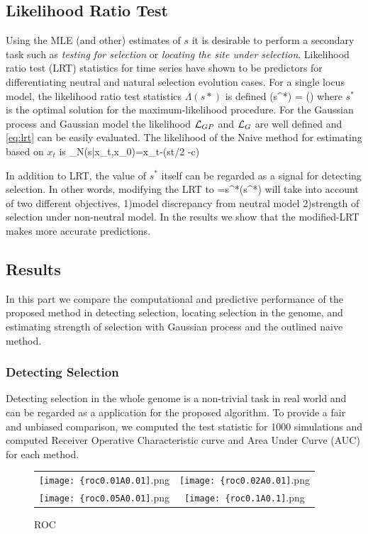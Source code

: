\subsection{Likelihood Ratio Test}
Using the MLE (and other) estimates of $s$ it is desirable to perform a secondary task such as \emph{testing for selection} or \emph{locating the site under selection}. Likelihood ratio test (LRT) statistics for time series \cite{feder2014} have shown to be predictors for differentiating neutral and natural selection evolution cases. For a single locus model, the likelihood ratio test statistics $\Lambda(s*)$ is defined
\beq \label{eq:lrt}
\Lambda(s^*) = \log \left(\right)
\eeq
where $s^*$ is the optimal solution for the maximum-likelihood procedure. For the Gaussian process and Gaussian model the likelihood ${\cal L}_{GP}$ and ${\cal L}_G$ are well defined and \eqref{eq:lrt} can be easily evaluated. The likelihood of the Naive method for estimating based on $x_t$ is 
\beq
\Lc_N(s|x_t,x_0)=x_t-\sigma(st/2 -c)
\eeq

In addition to LRT, the value of $s^*$ itself can be regarded as a signal for detecting selection. In other words, modifying the LRT to
\beq
\Theta=s^*\Lambda(s^*)
\eeq
will take into account of two different objectives, 1)model discrepancy from neutral model 2)strength of selection under non-neutral model. In the  results we show that the modified-LRT makes more accurate predictions.

\subsection{Results}
In this part we compare the computational and predictive performance of the proposed method in detecting selection, locating selection in the genome, and estimating strength of selection with Gaussian process and the outlined naive method.

\subsubsection{Detecting Selection}
Detecting selection in the whole genome is a non-trivial task in real world and can be regarded as a application for the proposed algorithm. To provide a fair and unbiased comparison, we computed the test statistic for 1000 simulations and computed Receiver Operative Characteristic curve and Area Under Curve (AUC) for each method.



\begin{figure}[H]
  \centering
  \begin{tabular}{cc}
      \texttt{[image: \{roc0.01A0.01]}.png} &    \texttt{[image: \{roc0.02A0.01]}.png}\\
          \texttt{[image: \{roc0.05A0.01]}.png}
&    \texttt{[image: \{roc0.1A0.1]}.png}  
  \end{tabular}

  \caption{ROC}
  \label{fig:Fig3a}
\end{figure}

